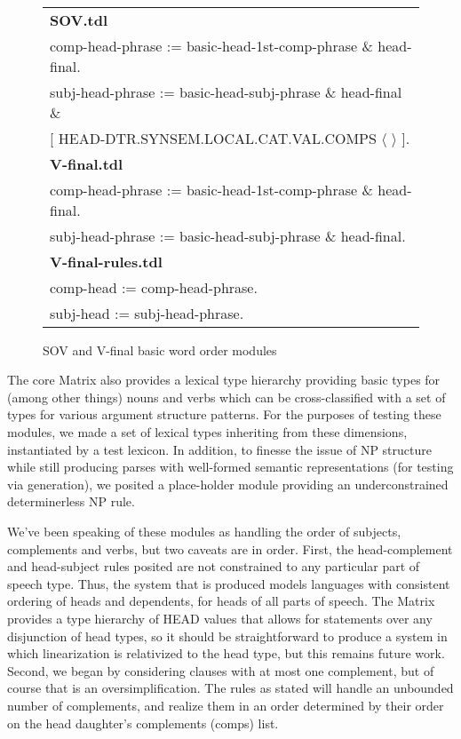 \documentclass[11pt]{article}
\begin{document}
\begin{figure*}[ht]
\begin{center}
{\tt\small
\begin{tabular}{l}
\hline
{\bf SOV.tdl}\\
comp-head-phrase := basic-head-1st-comp-phrase \& head-final.\\
subj-head-phrase := basic-head-subj-phrase \& head-final \&\\
   \phantom{foo}[ HEAD-DTR.SYNSEM.LOCAL.CAT.VAL.COMPS $\langle$ $\rangle$ ].\\
{\bf V-final.tdl}\\
comp-head-phrase := basic-head-1st-comp-phrase \& head-final.\\
subj-head-phrase := basic-head-subj-phrase \& head-final.\\
{\bf V-final-rules.tdl}\\
comp-head := comp-head-phrase.\\
subj-head := subj-head-phrase.\\
\hline
\end{tabular}
}
\end{center}
\caption{SOV and V-final basic word order modules}
\label{wordorderfig}
\end{figure*}


The core Matrix also provides a lexical type hierarchy
providing basic types for (among other things) nouns and verbs which
can be cross-classified with a set of types for various argument
structure patterns.  For the purposes of testing these modules,
we made a set of lexical types inheriting from these dimensions,
instantiated by a test lexicon.  In addition, to finesse the issue
of NP structure while still producing parses with well-formed semantic
representations (for testing via generation), we posited a place-holder
module providing an underconstrained determinerless NP rule.

We've been speaking of these modules as handling the order of
subjects, complements and verbs, but two caveats are in order.  First,
the head-complement and head-subject rules posited are not constrained
to any particular part of speech type. Thus, the system that is
produced models languages with consistent ordering of heads and
dependents, for heads of all parts of speech.  The Matrix provides a
type hierarchy of HEAD values that allows for statements over any
disjunction of head types, so it should be straightforward to produce
a system in which linearization is relativized to the head type, but
this remains future work.  Second, we began by considering clauses
with at most one complement, but of course that is an
oversimplification.  The rules as stated will handle an unbounded
number of complements, and realize them in an order determined by
their order on the head daughter's complements ({\sc comps}) list.
\end{document}
